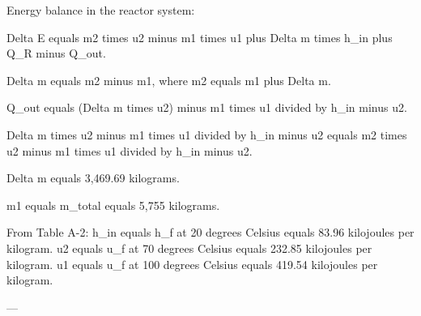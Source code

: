 Energy balance in the reactor system:  

Delta E equals m2 times u2 minus m1 times u1 plus Delta m times h_in plus Q_R minus Q_out.  

Delta m equals m2 minus m1, where m2 equals m1 plus Delta m.  

Q_out equals (Delta m times u2) minus m1 times u1 divided by h_in minus u2.  

Delta m times u2 minus m1 times u1 divided by h_in minus u2 equals m2 times u2 minus m1 times u1 divided by h_in minus u2.  

Delta m equals 3,469.69 kilograms.  

m1 equals m_total equals 5,755 kilograms.  

From Table A-2:  
h_in equals h_f at 20 degrees Celsius equals 83.96 kilojoules per kilogram.  
u2 equals u_f at 70 degrees Celsius equals 232.85 kilojoules per kilogram.  
u1 equals u_f at 100 degrees Celsius equals 419.54 kilojoules per kilogram.  

---